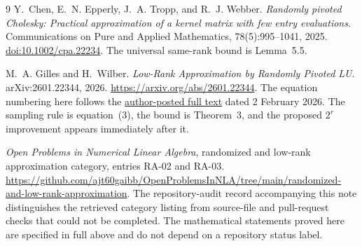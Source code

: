 \documentclass[11pt]{article}
\theoremstyle{remark}
\begin{document}
\begin{thebibliography}{9}
Y.~Chen, E.~N. Epperly, J.~A. Tropp, and R.~J. Webber.
\emph{Randomly pivoted Cholesky: Practical approximation of a kernel matrix
with few entry evaluations}.
Communications on Pure and Applied Mathematics, 78(5):995--1041, 2025.
\href{https://doi.org/10.1002/cpa.22234}{doi:10.1002/cpa.22234}.
The universal same-rank bound is Lemma~5.5.

M.~A. Gilles and H.~Wilber.
\emph{Low-Rank Approximation by Randomly Pivoted LU}.
arXiv:2601.22344, 2026.
\url{https://arxiv.org/abs/2601.22344}.
The equation numbering here follows the
\href{https://www.researchgate.net/publication/400339985_Low-Rank_Approximation_by_Randomly_Pivoted_LU}{author-posted full text}
dated 2 February 2026. The sampling rule is equation~(3), the bound is
Theorem~3, and the proposed $2^r$ improvement appears immediately after it.

\emph{Open Problems in Numerical Linear Algebra}, randomized and low-rank
approximation category, entries RA-02 and RA-03.
\url{https://github.com/ajt60gaibb/OpenProblemsInNLA/tree/main/randomized-and-low-rank-approximation}.
The repository-audit record accompanying this note distinguishes the retrieved
category listing from source-file and pull-request checks that could not be
completed. The mathematical statements proved here are specified in full
above and do not depend on a repository status label.
\end{thebibliography}
\end{document}
